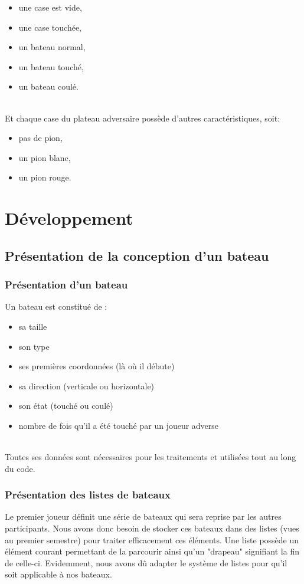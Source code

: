 \documentclass[a4paper,12pt]{article}
\begin{document}
                    \begin{itemize}
                        \item une case est vide,
                        \item une case touchée,
                        \item un bateau normal,
                        \item un bateau touché,
                        \item un bateau coulé.
                    \end{itemize}
                    \vspace{2\baselineskip}\\
                    Et chaque case du plateau adversaire possède d'autres caractéristiques, soit:\begin{itemize}
                        \item pas de pion,
                        \item un pion blanc,
                        \item un pion rouge.
                    \end{itemize}
\newpage
\section {Développement}
\subsection {Présentation de la conception d'un bateau}
\subsubsection{Présentation d'un bateau}
    Un bateau est constitué de :  
    \begin{itemize}
     \item sa taille 
     \item son type 
     \item ses premières coordonnées (là où il débute) 
     \item sa direction (verticale ou horizontale)
     \item son état (touché ou coulé) 
     \item nombre de fois qu'il a été touché par un joueur adverse
     \end{itemize}
    \\Toutes ses données sont nécessaires pour les traitements et utilisées tout au long du code.
\subsubsection{Présentation des listes de bateaux}
    Le premier joueur définit une série de bateaux qui sera reprise par les autres participants. Nous avons donc besoin de stocker ces bateaux dans des listes (vues au premier semestre) pour traiter efficacement ces éléments. Une liste possède un élément courant permettant de la parcourir ainsi qu'un "drapeau" signifiant la fin de celle-ci. Evidemment, nous avons dû adapter le système de listes pour qu'il soit applicable à nos bateaux.\\
\end{document}

